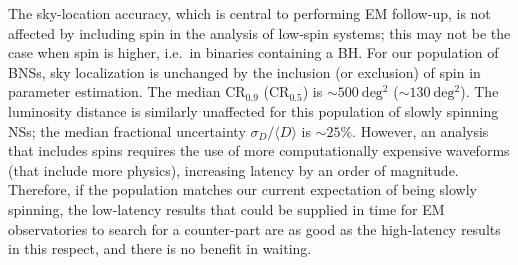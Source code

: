 The sky-location accuracy, which is central to performing EM follow-up, is not affected by including spin in the analysis of low-spin systems; this may not be the case when spin is higher, i.e.\ in binaries containing a BH. For our population of BNSs, sky localization is unchanged by the inclusion (or exclusion) of spin in parameter estimation. The median $\mathrm{CR}_{0.9}$ ($\mathrm{CR}_{0.5}$) is $\sim 500~\mathrm{deg^2}$ ($\sim 130~\mathrm{deg^2}$). The luminosity distance is similarly unaffected for this population of slowly spinning NSs; the median fractional uncertainty $\sigma_D/\langle D \rangle$ is $\sim 25\%$.  However, an analysis that includes spins requires the use of more computationally expensive waveforms (that include more physics), increasing latency by an order of magnitude.  Therefore, if the population matches our current expectation of being slowly spinning, the low-latency results that could be supplied in time for EM observatories to search for a counter-part are as good as the high-latency results in this respect, and there is no benefit in waiting.

  
  
  

  
  
  
  
  
  
  


  
  